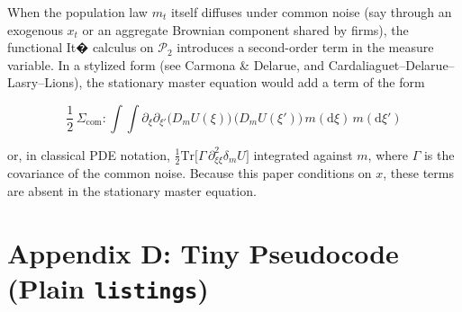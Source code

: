 ﻿\documentclass[11pt,letterpaper,oneside]{article}
\numberwithin{equation}{section}
\newcommand{\1}{\mathbf{1}}
\newcommand{\diff}{\mathrm{d}}
\newcommand{\dmU}{\delta_m U}
\newcommand{\Dm}{D_m}
\begin{document}
When the population law $m_t$ itself diffuses under common noise (say through an exogenous $x_t$ or an aggregate Brownian component shared by firms), the functional It� calculus on $\mathcal P_2$ introduces a second-order term in the measure variable. In a stylized form (see Carmona \& Delarue, and Cardaliaguet--Delarue--Lasry--Lions), the stationary master equation would add a term of the form

$$
\frac{1}{2}\,\Sigma_{\mathrm{com}}:\!\int\!\!\int
\partial_{\xi}\partial_{\xi'} \big(\Dm U(\xi)\big)\,\big(\Dm U(\xi')\big)
\, m(\diff \xi)\, m(\diff \xi')
$$

or, in classical PDE notation,
$\tfrac12 \mathrm{Tr}\big[\Gamma\,\partial_{\xi\xi}^2 \dmU\big]$
integrated against $m$, where $\Gamma$ is the covariance of the common noise. Because this paper conditions on $x$, these terms are absent in the stationary master equation.

\section{Appendix D: Tiny Pseudocode (Plain \texorpdfstring{\texttt{listings}}{listings})}\label{app:code}

\lstset{
basicstyle=\ttfamily\small,
columns=fullflexible,
showstringspaces=false,
frame=single,
framerule=0.4pt,
breaklines=true,
tabsize=2,
captionpos=b
}
\end{document}

